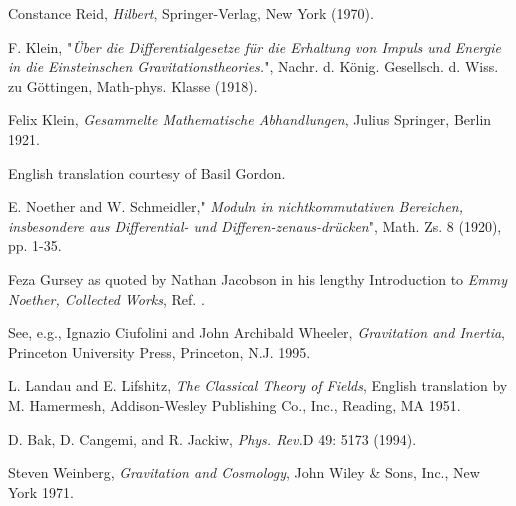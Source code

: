 \documentclass[12pt]{article}
\begin{document}
\begin{thebibliography}{999}
 Constance Reid, {\it{Hilbert}}, Springer-Verlag, New York
(1970).


    

  F. Klein, "{\it{\"{U}ber die Differentialgesetze f\"{u}r
die Erhaltung von Impuls und Energie in die Einsteinschen
Gravitationstheories.}}", Nachr. d. K\"{o}nig. Gesellsch. d.
Wiss. zu G\"{o}ttingen, Math-phys. Klasse (1918).



 Felix Klein, {\it{Gesammelte Mathematische Abhandlungen}},
Julius Springer, Berlin 1921.

English translation 
courtesy of Basil Gordon.


E. Noether and W. Schmeidler," {\it{Moduln in nichtkommutativen Bereichen,
 insbesondere aus Differential-
  und Differen-zenaus-dr\"ucken}}", Math.
 Zs. 8 (1920), pp. 1-35.

 Feza Gursey as quoted by Nathan Jacobson in his lengthy Introduction to {\it{Emmy Noether, Collected Works}},
Ref. \cite{publist}.

 See, e.g., Ignazio Ciufolini and John Archibald Wheeler,{\it{
Gravitation and Inertia}}, Princeton University Press, Princeton, N.J.
1995.

 
 L. Landau and E. Lifshitz, {\it{The Classical Theory of Fields}},
English translation by M. Hamermesh, Addison-Wesley Publishing Co., Inc.,
Reading, MA 1951. 


 D. Bak, D. Cangemi, and R. Jackiw, {\it{Phys. Rev.}}D 49: 5173
(1994).

 Steven Weinberg, {\it{Gravitation and Cosmology}}, John Wiley \& 
Sons, Inc., New York 1971.

\end{thebibliography}
\end{document}
